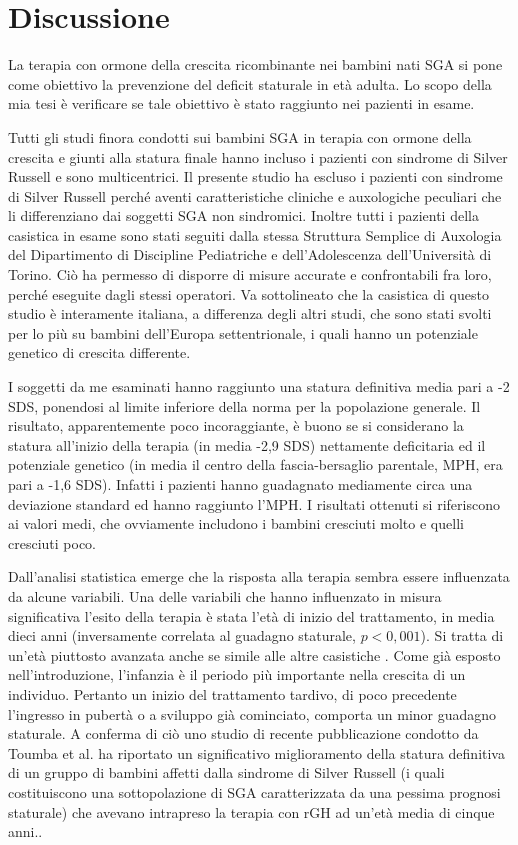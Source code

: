 \chapter{Discussione}

La terapia con ormone della crescita ricombinante nei bambini nati SGA si pone come obiettivo la prevenzione del deficit staturale in età adulta.
Lo scopo della mia tesi è verificare se tale obiettivo è stato raggiunto nei pazienti in esame.

Tutti gli studi finora condotti sui bambini SGA in terapia con ormone della crescita e giunti alla statura finale hanno incluso i pazienti con sindrome di Silver Russell e sono multicentrici. Il presente studio ha escluso i pazienti con sindrome di Silver Russell perché aventi caratteristiche cliniche e auxologiche peculiari che li differenziano dai soggetti SGA non sindromici. Inoltre tutti i pazienti della casistica in esame sono stati seguiti dalla stessa Struttura Semplice di Auxologia del Dipartimento di Discipline Pediatriche e dell'Adolescenza dell'Università  di Torino. Ciò ha permesso di disporre di misure accurate e confrontabili fra loro, perché eseguite dagli stessi operatori. Va sottolineato che la casistica di questo studio è interamente italiana, a differenza degli altri studi, che sono stati svolti per lo più su bambini dell'Europa settentrionale, i quali hanno un potenziale genetico di crescita differente.

I soggetti da me esaminati hanno raggiunto una statura definitiva media pari a -2 SDS, ponendosi al limite inferiore della norma per la popolazione generale. Il risultato, apparentemente poco incoraggiante, è buono se si considerano la statura all'inizio della terapia (in media -2,9 SDS) nettamente deficitaria ed il potenziale genetico (in media il centro della fascia-bersaglio parentale, MPH, era pari a -1,6 SDS). Infatti i pazienti hanno guadagnato mediamente circa una deviazione standard ed hanno raggiunto l'MPH. I risultati ottenuti si riferiscono ai valori medi, che ovviamente includono i bambini cresciuti molto e quelli cresciuti poco. 

Dall'analisi statistica emerge che la risposta alla terapia sembra essere influenzata da alcune variabili.
Una delle variabili che hanno influenzato in misura significativa l'esito della terapia è stata l'età di inizio del trattamento, in media dieci anni (inversamente correlata al guadagno staturale, $p < 0,001$). Si tratta di un'età piuttosto avanzata anche se simile alle altre casistiche\cite{coutant1998short} \cite{zucchini2001final}. Come già esposto nell'introduzione, l'infanzia è il periodo più importante nella crescita di un individuo. Pertanto un inizio del trattamento tardivo, di poco precedente l'ingresso in pubertà o a sviluppo già cominciato, comporta un minor guadagno staturale. A conferma di ciò uno studio di recente pubblicazione condotto da Toumba et al. ha riportato un significativo miglioramento della statura definitiva di un gruppo di bambini affetti dalla sindrome di Silver Russell (i quali costituiscono una sottopolazione di SGA caratterizzata da una pessima prognosi staturale) che avevano intrapreso la terapia con rGH ad un'età media di cinque anni.\cite{toumba2010effect}. 


